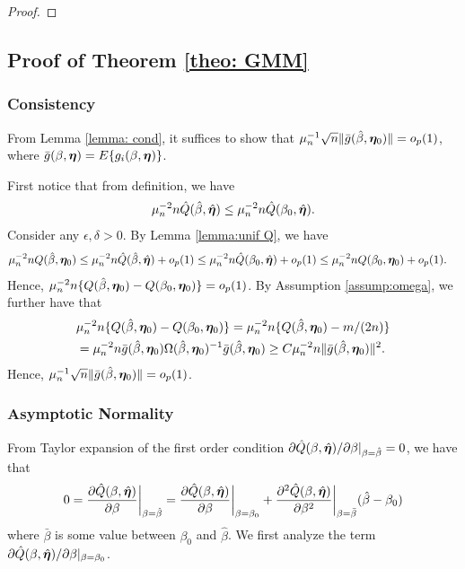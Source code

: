 \documentclass[12pt]{article}
\begin{document}
{\begin{proof}
\end{proof}


\subsection{Proof of Theorem \ref{theo: GMM}} \label{sec: proof of theo gmm}
\subsubsection{Consistency} \label{subsec: consistency}
From Lemma \ref{lemma: cond}, it suffices to show that $
\mu_n^{-1}\sqrt{n} \| \bar g (\hat\beta, \bm \eta_0)\| =o_p(1)$, where  $\bar g(\beta, \bm \eta)= E\{ g_i (\beta, \bm \eta)\}$.

First notice that from definition,  we have 
\begin{align*}
  \mu_n^{-2} n \hat Q(\hat\beta, \hat{\bm \eta}) \leq \mu_n^{-2} n \hat Q(\beta_0, \hat{\bm \eta}). 
\end{align*}
Consider any $\epsilon, \delta>0$.  By Lemma \ref{lemma:unif Q}, we have
\begin{align}
    \mu_n^{-2}n Q(\hat\beta, \bm \eta_0)&\leq   \mu_n^{-2}n \hat Q(\hat \beta, \hat{\bm \eta}) +o_p(1) \leq \mu_n^{-2} n \hat Q( \beta_0, \hat{\bm \eta}) +o_p(1) \leq \mu_n^{-2} n  Q( \beta_0, \bm \eta_0) +o_p(1). 
\end{align}
Hence, $\mu_n^{-2} n \{Q(\hat\beta, \bm \eta_0) - Q(\beta_0, \bm \eta_0)\}=o_p(1)$. By Assumption \ref{assump:omega}, we further have that
\begin{align*}
   &\mu_n^{-2} n \{Q(\hat\beta, \bm \eta_0) - Q(\beta_0, \bm \eta_0)\}  = \mu_n^{-2} n \{Q(\hat\beta, \bm \eta_0) - m/(2n)\} \\
   &=\mu_n^{-2} n  \bar g (\hat\beta, \bm \eta_0) \Omega (\hat\beta, \bm \eta_0)^{-1} \bar g (\hat\beta, \bm \eta_0) \geq C \mu_n^{-2}n \| \bar g (\hat\beta, \bm \eta_0)\|^2.
\end{align*} 
Hence, $
\mu_n^{-1}\sqrt{n} \| \bar g (\hat\beta, \bm \eta_0)\| =o_p(1)$. 

\subsubsection{Asymptotic Normality}\label{subsec: normal}
From Taylor expansion of the first order condition $\partial \hat Q(\beta, \hat{\bm \eta})/\partial \beta |_{\beta=\hat\beta}=0$, we have that 
\[
0= \frac{\partial \hat Q(\beta, \hat{\bm \eta})}{\partial \beta} \bigg|_{\beta=\hat\beta} = \frac{\partial \hat Q(\beta, \hat{\bm \eta})}{\partial \beta}\bigg|_{\beta=\beta_0} + \frac{\partial^2 \hat Q (\beta, \hat{\bm \eta})}{\partial \beta^2} \bigg|_{\beta=\bar\beta} (\hat\beta- \beta_0)
\]
where $\bar\beta$ is some value between $\beta_0$ and $\hat\beta$. We first analyze the term $\partial \hat Q(\beta, \hat{\bm \eta})/\partial \beta|_{\beta=\beta_0} $.



}
\end{document}
